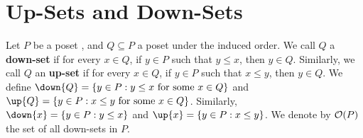 \section{Up-Sets and Down-Sets}
\label{section_1.6}

\begin{definition}
  Let $P$ be a poset , and $Q \subseteq P$ a poset under the induced
  order. We call $Q$ a \textbf{down-set} if for every $x \in Q$, if $y
  \in P$ such that $y \leq x$, then $y \in Q$. Similarly, we call $Q$
  an \textbf{up-set} if for every $x \in Q$, if $y \in P$ such that $x
  \leq y$, then $y \in Q$. We define $\down{Q}=\{ y \in P : y \leq x
  \text{ for some } x \in Q\}$ and $\up{Q}=\{ y \in P : x \leq y
\text{ for some } x \in Q\}$. Similarly, $\down{x}=\{y \in P : y \leq
x\}$ and $\up{x}=\{y \in P: x \leq y\}$. We denote by $\mathcal{O}(P)$ the set
of all down-sets in $P$.
\end{definition}

